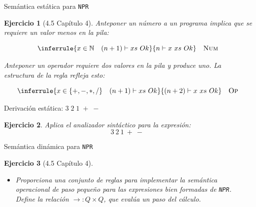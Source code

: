 \documentclass[11pt]{beamer}
\newtheorem{exercise}{Ejercicio}
\begin{document}
\begin{frame}{Semántica estática para  \texttt{NPR}}
	\begin{exercise}[4.5 Capítulo 4] 
		
		Anteponer un número a un programa implica que se requiere un valor menos en la pila:
		
		\[
		\inferrule{x \in \mathbb{N} \quad (n+1) \vdash xs \ Ok}{n \vdash x\ xs \ Ok} \quad \textsc{Num}
		\]
		
		\medskip
		
		Anteponer un operador requiere dos valores en la pila y produce uno. La estructura de la regla refleja esto:
		
		\[
		\inferrule{x \in \{+,-,*,/\} \quad (n+1) \vdash xs \ Ok}{(n+2) \vdash x\ xs \ Ok} \quad \textsc{Op}
		\]
	\end{exercise}
\end{frame}

\begin{frame}{Derivación estática: $3\;2\;1\;+\;-$}
	
	\begin{exercise}
		
		Aplica el analizador sintáctico para la expresión: 
		\[
			 3\ 2\ 1\ +\ -\
		\]
		
		\centering
	\end{exercise}
	
\end{frame}


\begin{frame}{Semántica dinámica para  \texttt{NPR}}
	\begin{exercise}[4.5 Capítulo 4]
		\begin{itemize}
			\item Proporciona una conjunto de reglas para implementar la semántica operacional de paso pequeño para las expresiones bien formadas de \texttt{NPR}. Define la relación $\rightarrow : Q \times Q$, que evalúa un paso del cálculo.
		\end{itemize}
	\end{exercise}	
\end{frame}
\end{document}
